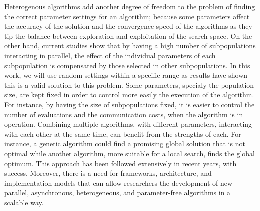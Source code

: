 \documentclass[runningheads]{llncs}
\begin{document}
Heterogenous algorithms add another degree of freedom to the problem of finding
the correct parameter settings for an algorithm; because some parameters affect
the accuracy of the solution and the convergence speed of the algorithms as they
tip the balance between exploration and exploitation of the search space. On the
other hand, current studies show that by having a high number of subpopulations
interacting in parallel, the effect of the individual parameters of each
subpopulation is compensated by those selected in other subpopulations. In this
work, we will use random settings within a specific range as results have shown
this is a valid solution to this problem. 
Some parameters, specialy the population size, are
kept fixed in order to control more easily the execution of the algorithm. For
instance, by having the size of subpopulations fixed, it is easier to control
the number of evaluations and the communication costs, when the algorithm is in
operation.
Combining multiple algorithms, with different parameters, interacting with each
other at the same time, can benefit from the strengths of each. For instance, a
genetic algorithm could find a promising global solution that is not optimal
while another algorithm, more suitable for a local search, finds the global
optimum. This approach has been followed extensively in recent years, with
success. Moreover, there is a need for frameworks, architecture, and
implementation models that can allow researchers the development of new
parallel, asynchronous, heterogeneous, and parameter-free algorithms in a scalable way.  



\end{document}

